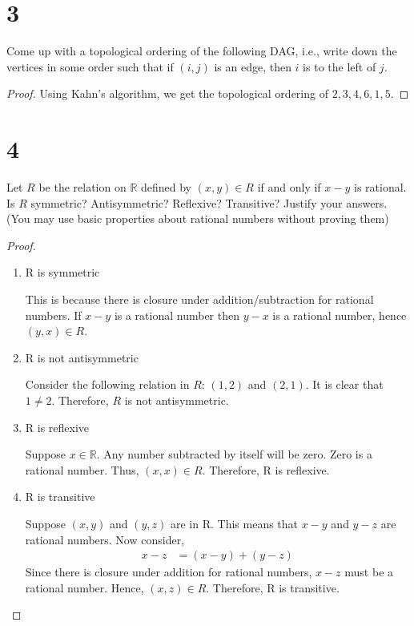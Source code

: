 \documentclass[11pt]{scrartcl}
\begin{document}
\section{3}
Come up with a topological ordering of the following DAG, i.e., write
down the vertices in some order such that if $(i, j)$ is an edge, then $i$ is
to the left of $j$.
\begin{proof}
Using Kahn's algorithm, we get the topological ordering of 
$2,3,4,6,1,5$.
\end{proof}

\section{4}
Let $R$ be the relation on $\mathbb{R}$ defined by $(x, y) \in R$ if and only if $x - y$
is rational. Is $R$ symmetric? Antisymmetric? Reflexive? Transitive?
Justify your answers. (You may use basic properties about rational
numbers without proving them)
\begin{proof}\
	\begin{enumerate}[label=\alph*.]
		\item{
			R is symmetric\par
			This is because there is closure under addition/subtraction for rational numbers.
			If $x - y$ is a rational number then $y - x$ is a rational number, hence 
			$(y,x) \in R$. 
		}
		\item{
			R is not antisymmetric \par
			Consider the following relation in $R$: $(1,2)$ and $(2,1)$.  
			It is clear that $1 \neq 2$. Therefore, $R$ is not antisymmetric.
		}
		\item{
			R is reflexive \par
			Suppose $x \in \mathbb{R}$. Any number subtracted by itself will be zero.
			Zero is a rational number. Thus, $(x,x) \in R$. Therefore, R is reflexive.
		}
		\item{
			R is transitive \par
			Suppose $(x,y)$ and $(y,z)$ are in R. This means that $x - y$ and $y - z$ are rational
			numbers. Now consider,
			\begin{align*}
				x - z & = (x - y) + (y - z)
			\end{align*}
			Since there is closure under addition for rational numbers, $x - z$ must be a rational number.
			Hence, $(x,z) \in R$. Therefore, R is transitive.
 		}
	\end{enumerate}
\end{proof}
\end{document}

